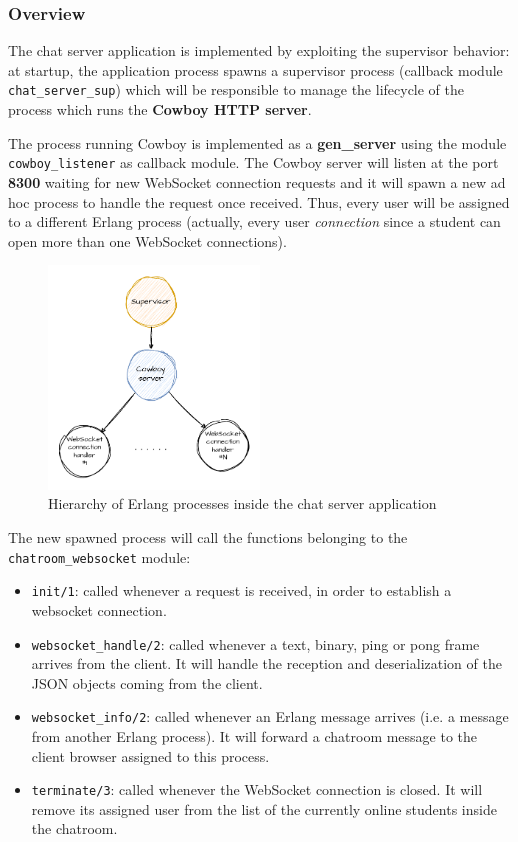 \subsubsection{Overview}
\label{subsubsec:erlang/overview}

\begin{sloppypar}
The chat server application is implemented by exploiting the supervisor behavior: at startup, the application process spawns a supervisor process (callback module \texttt{chat\_server\_sup}) which will be responsible to manage the lifecycle of the process which runs the \textbf{Cowboy HTTP server}.

The process running Cowboy is implemented as a \textbf{gen\_server} using the module \texttt{cowboy\_listener} as callback module.
The Cowboy server will listen at the port \textbf{8300} waiting for new WebSocket connection requests and it will spawn a new ad hoc process to handle the request once received. Thus, every user will be assigned to a different Erlang process (actually, every user \textit{connection} since a student can open more than one WebSocket connections).


\begin{figure}[ht]
	\centering
	\includegraphics[width=0.5\textwidth]{img/system_architecture/erlang_diagram.pdf}
	\caption{Hierarchy of Erlang processes inside the chat server application}
	\label{fig:erlang-hierarchy}
\end{figure}


The new spawned process will call the functions belonging to the \texttt{chatroom\_websocket} module:
\begin{itemize}
    \item \texttt{init/1}: called whenever a request is received, in order to establish a websocket connection.
    \item \texttt{websocket\_handle/2}: called whenever a text, binary, ping or pong frame arrives from the client. It will handle the reception and deserialization of the JSON objects coming from the client.
    \item \texttt{websocket\_info/2}: called whenever an Erlang message arrives (i.e. a message from another Erlang process). It will forward a chatroom message to the client browser assigned to this process.
    \item \texttt{terminate/3}: called whenever the WebSocket connection is closed. It will remove its assigned user from the list of the currently online students inside the chatroom.
\end{itemize}



\end{sloppypar}

